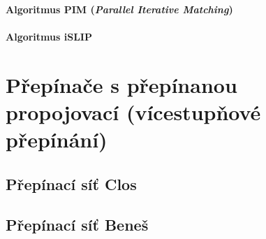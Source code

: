 \paragraph*{Algoritmus PIM (\textit{Parallel Iterative Matching})} 

\paragraph*{Algoritmus iSLIP} 


\section{Přepínače s přepínanou propojovací (vícestupňové přepínání)}


\subsection{Přepínací síť Clos}


\subsection{Přepínací síť Beneš}

